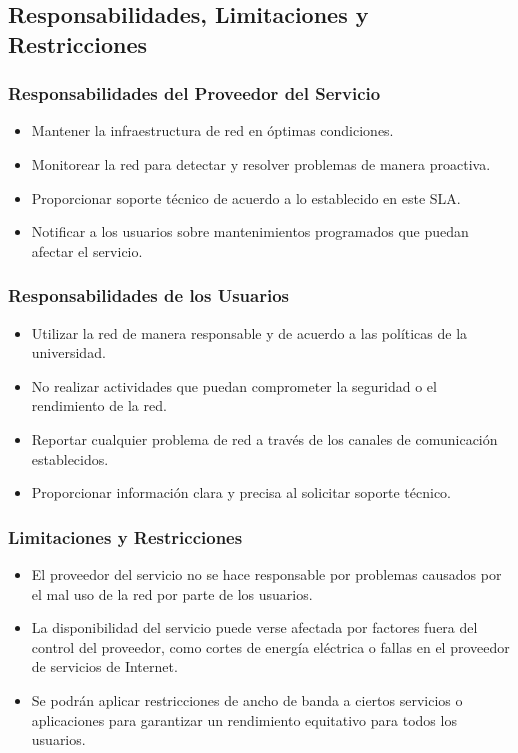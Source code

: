 \subsection{Responsabilidades, Limitaciones y Restricciones}

\subsubsection{Responsabilidades del Proveedor del Servicio}
\begin{itemize}
    \item Mantener la infraestructura de red en óptimas condiciones.
    \item Monitorear la red para detectar y resolver problemas de manera proactiva.
    \item Proporcionar soporte técnico de acuerdo a lo establecido en este SLA.
    \item Notificar a los usuarios sobre mantenimientos programados que puedan afectar el servicio.
\end{itemize}

\subsubsection{Responsabilidades de los Usuarios}
\begin{itemize}
    \item Utilizar la red de manera responsable y de acuerdo a las políticas de la universidad.
    \item No realizar actividades que puedan comprometer la seguridad o el rendimiento de la red.
    \item Reportar cualquier problema de red a través de los canales de comunicación establecidos.
    \item Proporcionar información clara y precisa al solicitar soporte técnico.
\end{itemize}

\subsubsection{Limitaciones y Restricciones}
\begin{itemize}
    \item El proveedor del servicio no se hace responsable por problemas causados por el mal uso de la red por parte de los usuarios.
    \item La disponibilidad del servicio puede verse afectada por factores fuera del control del proveedor, como cortes de energía eléctrica o fallas en el proveedor de servicios de Internet.
    \item Se podrán aplicar restricciones de ancho de banda a ciertos servicios o aplicaciones para garantizar un rendimiento equitativo para todos los usuarios.
\end{itemize}
